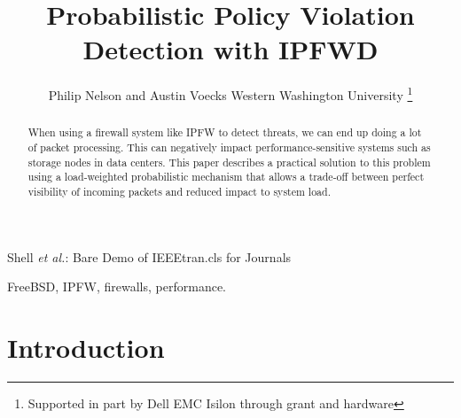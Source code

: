 \documentclass[journal]{IEEEtran}
\begin{document}
%
\title{Probabilistic Policy Violation Detection with IPFWD}

\author{Philip Nelson and Austin Voecks%
Western Washington University
\thanks{Supported in part by Dell EMC Isilon through grant and hardware}}


%
{Shell \MakeLowercase{\textit{et al.}}: Bare Demo of IEEEtran.cls for Journals}
% 

\maketitle


\begin{abstract}
When using a firewall system like IPFW to detect threats, we can end up doing a
lot of packet processing. This can negatively impact performance-sensitive
systems such as storage nodes in data centers. This paper describes a
practical solution to this problem using a load-weighted probabilistic
mechanism that allows a trade-off between perfect visibility of incoming
packets and reduced impact to system load.  

\end{abstract}


\begin{IEEEkeywords}
FreeBSD, IPFW, firewalls, performance.
\end{IEEEkeywords}


%
\IEEEpeerreviewmaketitle


\section{Introduction}
\end{document}
